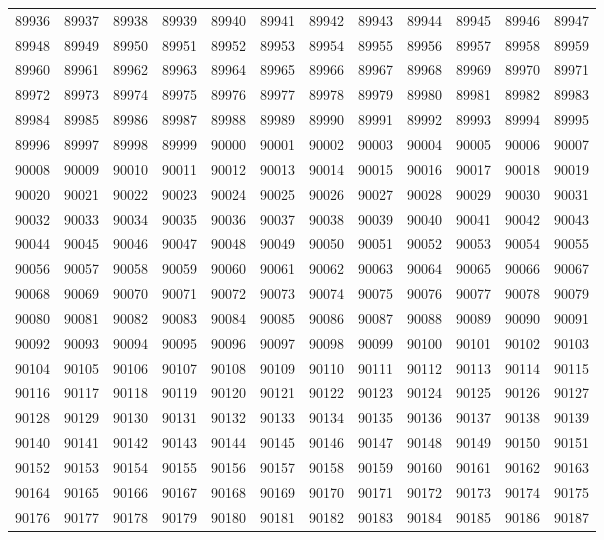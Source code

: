\begin{center}
\begin{longtable}{llllllllllll}
89936 &89937 &89938 &89939 &89940 &89941 &89942 &89943 &89944 &89945 &89946 &89947 \\
89948 &89949 &89950 &89951 &89952 &89953 &89954 &89955 &89956 &89957 &89958 &89959 \\
89960 &89961 &89962 &89963 &89964 &89965 &89966 &89967 &89968 &89969 &89970 &89971 \\
89972 &89973 &89974 &89975 &89976 &89977 &89978 &89979 &89980 &89981 &89982 &89983 \\
89984 &89985 &89986 &89987 &89988 &89989 &89990 &89991 &89992 &89993 &89994 &89995 \\
89996 &89997 &89998 &89999 &90000 &90001 &90002 &90003 &90004 &90005 &90006 &90007 \\
90008 &90009 &90010 &90011 &90012 &90013 &90014 &90015 &90016 &90017 &90018 &90019 \\
90020 &90021 &90022 &90023 &90024 &90025 &90026 &90027 &90028 &90029 &90030 &90031 \\
90032 &90033 &90034 &90035 &90036 &90037 &90038 &90039 &90040 &90041 &90042 &90043 \\
90044 &90045 &90046 &90047 &90048 &90049 &90050 &90051 &90052 &90053 &90054 &90055 \\
90056 &90057 &90058 &90059 &90060 &90061 &90062 &90063 &90064 &90065 &90066 &90067 \\
90068 &90069 &90070 &90071 &90072 &90073 &90074 &90075 &90076 &90077 &90078 &90079 \\
90080 &90081 &90082 &90083 &90084 &90085 &90086 &90087 &90088 &90089 &90090 &90091 \\
90092 &90093 &90094 &90095 &90096 &90097 &90098 &90099 &90100 &90101 &90102 &90103 \\
90104 &90105 &90106 &90107 &90108 &90109 &90110 &90111 &90112 &90113 &90114 &90115 \\
90116 &90117 &90118 &90119 &90120 &90121 &90122 &90123 &90124 &90125 &90126 &90127 \\
90128 &90129 &90130 &90131 &90132 &90133 &90134 &90135 &90136 &90137 &90138 &90139 \\
90140 &90141 &90142 &90143 &90144 &90145 &90146 &90147 &90148 &90149 &90150 &90151 \\
90152 &90153 &90154 &90155 &90156 &90157 &90158 &90159 &90160 &90161 &90162 &90163 \\
90164 &90165 &90166 &90167 &90168 &90169 &90170 &90171 &90172 &90173 &90174 &90175 \\
90176 &90177 &90178 &90179 &90180 &90181 &90182 &90183 &90184 &90185 &90186 &90187 \\

\end{longtable}
\end{center}
